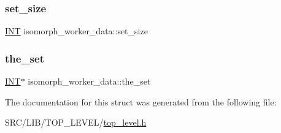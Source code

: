 \subsubsection{\texorpdfstring{set\+\_\+size}{set\_size}}
{\footnotesize\ttfamily \mbox{\hyperlink{galois_8h_a09fddde158a3a20bd2dcadb609de11dc}{I\+NT}} isomorph\+\_\+worker\+\_\+data\+::set\+\_\+size}

\mbox{\label{structisomorph__worker__data_aeebcf1f17e7ba2804da0d1345af1946a}} 
\subsubsection{\texorpdfstring{the\+\_\+set}{the\_set}}
{\footnotesize\ttfamily \mbox{\hyperlink{galois_8h_a09fddde158a3a20bd2dcadb609de11dc}{I\+NT}}$\ast$ isomorph\+\_\+worker\+\_\+data\+::the\+\_\+set}



The documentation for this struct was generated from the following file\+:\begin{DoxyCompactItemize}
\item 
S\+R\+C/\+L\+I\+B/\+T\+O\+P\+\_\+\+L\+E\+V\+E\+L/\mbox{\hyperlink{top__level_8h}{top\+\_\+level.\+h}}\end{DoxyCompactItemize}
